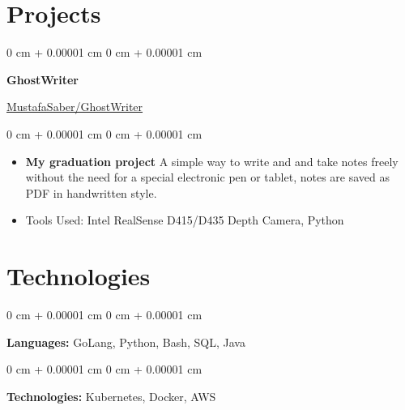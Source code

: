\documentclass[10pt, letterpaper]{article}
\newenvironment{highlights}{
    \begin{itemize}[
        topsep=0.10 cm,
        parsep=0.10 cm,
        partopsep=0pt,
        itemsep=0pt,
        leftmargin=0 cm + 10pt
    ]
}{
    \end{itemize}
} %
\newenvironment{onecolentry}{
    \begin{adjustwidth}{
        0 cm + 0.00001 cm
    }{
        0 cm + 0.00001 cm
    }
}{
    \end{adjustwidth}
} %
\newenvironment{twocolentry}[2][]{
    \onecolentry
    \def\secondColumn{#2}
    \setcolumnwidth{\fill, 4.5 cm}
    \begin{paracol}{2}
}{
    \switchcolumn \raggedleft \secondColumn
    \end{paracol}
    \endonecolentry
} %
\begin{document}
    \section{Projects}
        \begin{twocolentry}{
            \href{https://github.com/MustafaSaber/GhostWriter}{MustafaSaber/GhostWriter}
        }
        \textbf{GhostWriter}
        \end{twocolentry}
        
        \vspace{0.10 cm}
        \begin{onecolentry}
            \begin{highlights}
                \item \textbf{My graduation project} A simple way to write and and take notes freely without the need for a special electronic pen or tablet, notes are saved as PDF in handwritten style.
                \item Tools Used: Intel RealSense D415/D435 Depth Camera, Python
            \end{highlights}
        \end{onecolentry}
        \vspace{0.2 cm}

    \section{Technologies}
        \begin{onecolentry}
            \textbf{Languages:} GoLang, Python, Bash, SQL, Java
        \end{onecolentry}

        \vspace{0.2 cm}

        \begin{onecolentry}
            \textbf{Technologies:} Kubernetes, Docker, AWS
        \end{onecolentry}
\end{document}
